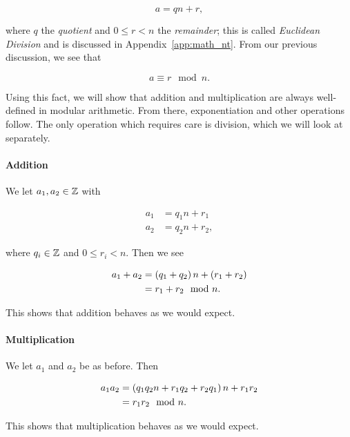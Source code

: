 \begin{equation}
    a = qn + r,
\end{equation}

\noindent
where $q$ the \emph{quotient}
and $0\le r < n$ the \emph{remainder};
this is called \emph{Euclidean Division}
and is discussed in Appendix~\ref{app:math_nt}.
From our previous discussion, we see that

\begin{equation}
    a\equiv r\mod n.
\end{equation}

\noindent
Using this fact, we will show that addition and multiplication
are always well-defined in modular arithmetic.
From there, exponentiation and other operations follow.
The only operation which requires care is division,
which we will look at separately.

\paragraph{Addition} We let $a_{1}, a_{2}\in\mathbb{Z}$ with

\begin{align}
    a_{1} &= q_{1}n + r_{1} \nonumber\\
    a_{2} &= q_{2}n + r_{2},
\end{align}

\noindent
where $q_{i}\in\mathbb{Z}$ and $0\le r_{i} < n$.
Then we see

\begin{align}
    a_{1} + a_{2} &= \left( q_{1} + q_{2} \right)n + \left( r_{1}+r_{2} \right)
        \nonumber\\
    &= r_{1} + r_{2} \mod n.
\end{align}

\noindent
This shows that addition behaves as we would expect.

\paragraph{Multiplication} We let $a_{1}$ and $a_{2}$ be as before.
Then

\begin{align}
    a_{1}a_{2} &= \left( q_{1}q_{2}n + r_{1}q_{2} + r_{2}q_{1} \right)n + r_{1}r_{2}
        \nonumber\\
    &= r_{1}r_{2} \mod n.
\end{align}

\noindent
This shows that multiplication behaves as we would expect.

